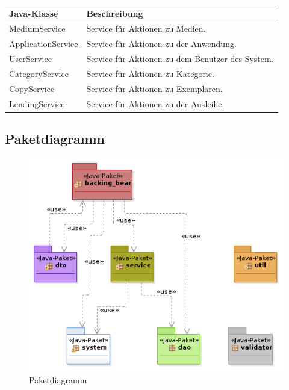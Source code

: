 \documentclass{article}
\begin{document}
     \begin{center}
       \begin{table}
        \begin{tabular} { |p{}|p{}| }
             \hline
            Java-Klasse & Beschreibung \\
            \hline\hline
            MediumService &  Service für Aktionen zu Medien. \\
             \hline
            ApplicationService & Service für Aktionen zu der Anwendung. \\
            \hline
            UserService & Service für Aktionen zu dem Benutzer des System. \\
            \hline
            CategoryService & Service für Aktionen zu Kategorie. \\
            \hline
            CopyService& Service für Aktionen zu Exemplaren.\\
             \hline
           LendingService & Service für Aktionen zu der Ausleihe. \\
           \hline
        \end{tabular}
        \end{table}
        \end{center}

\subsection{Paketdiagramm}

    \begin{figure}[h!]
        \includegraphics[scale=0.6]{Paketdigram.png}
        \caption{Paketdiagramm}
        \label{fig:Paketdiagramm}
    \end{figure}
\end{document}
